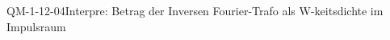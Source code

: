 
\begin{CONC}{QM-1-12-04}{Interpre: Betrag der Inversen Fourier-Trafo als W-keitsdichte im Impulsraum}
\end{CONC}
